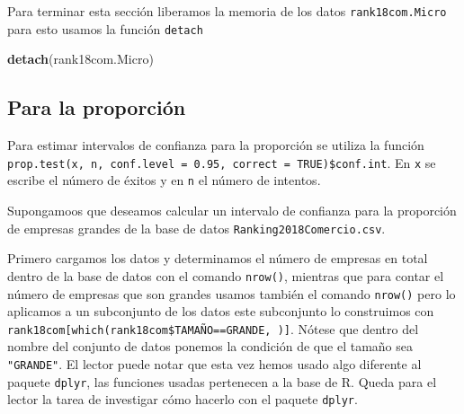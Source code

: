 \documentclass[
]{krantz}
\makeatletter
\newenvironment{Shaded}{\begin{snugshade}}{\end{snugshade}}
\newcommand{\CommentTok}[1]{\textcolor[rgb]{0.37,0.37,0.37}{\textit{#1}}}
\newcommand{\DataTypeTok}[1]{\textcolor[rgb]{0.27,0.27,0.27}{#1}}
\newcommand{\FloatTok}[1]{\textcolor[rgb]{0.06,0.06,0.06}{#1}}
\newcommand{\KeywordTok}[1]{\textcolor[rgb]{0.27,0.27,0.27}{\textbf{#1}}}
\newcommand{\NormalTok}[1]{#1}
\newcommand{\OperatorTok}[1]{\textcolor[rgb]{0.43,0.43,0.43}{\textbf{#1}}}
\newenvironment{kframe}{%
\medskip{}
\setlength{\fboxsep}{.8em}
 \def\at@end@of@kframe{}%
 \ifinner\ifhmode%
  \def\at@end@of@kframe{\end{minipage}}%
  \begin{minipage}{\columnwidth}%
 \fi\fi%
 \def\FrameCommand##1{\hskip\@totalleftmargin \hskip-\fboxsep
 \colorbox{shadecolor}{##1}\hskip-\fboxsep
     \hskip-\linewidth \hskip-\@totalleftmargin \hskip\columnwidth}%
 \MakeFramed {\advance\hsize-\width
   \@totalleftmargin\z@ \linewidth\hsize
   \@setminipage}}%
 {\par\unskip\endMakeFramed%
 \at@end@of@kframe}
\renewenvironment{Shaded}{\begin{kframe}}{\end{kframe}}
\makeatother
\begin{document}
\begin{Shaded}
\end{Shaded}

Para terminar esta sección liberamos la memoria de los datos \texttt{rank18com.Micro} para esto usamos la función \texttt{detach}

\begin{Shaded}
\begin{Highlighting}[]
\KeywordTok{detach}\NormalTok{(rank18com.Micro)}
\end{Highlighting}
\end{Shaded}

\hypertarget{para-la-proporcion}{%
\subsection{Para la proporción}\label{para-la-proporcion}}

Para estimar intervalos de confianza para la proporción se utiliza la función \texttt{prop.test(x,\ n,\ conf.level\ =\ 0.95,\ correct\ =\ TRUE)\$conf.int}. En \texttt{x} se escribe el número de éxitos y en \texttt{n} el número de intentos.

Supongamoos que deseamos calcular un intervalo de confianza para la proporción de empresas grandes de la base de datos \texttt{Ranking2018Comercio.csv}.

Primero cargamos los datos y determinamos el número de empresas en total dentro de la base de datos con el comando \texttt{nrow()}, mientras que para contar el número de empresas que son grandes usamos también el comando \texttt{nrow()} pero lo aplicamos a un subconjunto de los datos este subconjunto lo construimos con \texttt{rank18com{[}which(rank18com\$TAMAÑO==\textquotesingle{}GRANDE\textquotesingle{},\ ){]}}. Nótese que dentro del nombre del conjunto de datos ponemos la condición de que el tamaño sea \texttt{"GRANDE"}. El lector puede notar que esta vez hemos usado algo diferente al paquete \texttt{dplyr}, las funciones usadas pertenecen a la base de R. Queda para el lector la tarea de investigar cómo hacerlo con el paquete \texttt{dplyr}.
\end{document}

